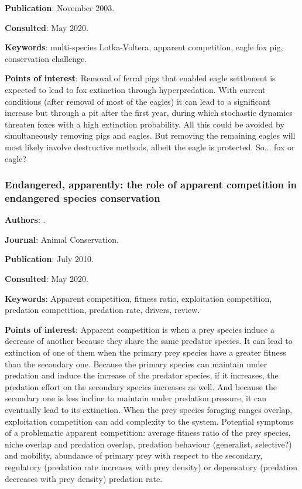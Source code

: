 \documentclass[12pt,a4paper]{article}
\begin{document}
\textbf{Publication}: November 2003.

\textbf{Consulted}: May 2020.

\textbf{Keywords}: multi-species Lotka-Voltera, apparent competition, eagle fox pig, conservation challenge.

\textbf{Points of interest}: Removal of ferral pigs that enabled eagle settlement is expected to lead to fox extinction through hyperpredation. With current conditions (after removal of most of the eagles) it can lead to a significant increase but through a pit after the first year, during which stochastic dynamics threaten foxes with a high extinction probability. All this could be avoided by simultaneously removing pigs and eagles. But removing the remaining eagles will most likely involve destructive methods, albeit the eagle is protected. So... fox or eagle?

\newpage 

\subsubsection*{Endangered, apparently: the role of apparent competition in endangered species conservation}

\textbf{Authors}: \cite{decesare2010endangered}.

\textbf{Journal}: Animal Conservation.

\textbf{Publication}: July 2010.

\textbf{Consulted}: May 2020.

\textbf{Keywords}: Apparent competition, fitness ratio, exploitation competition, predation competition, predation rate, drivers, review.

\textbf{Points of interest}: Apparent competition is when a prey species induce a decrease of another because they share the same predator species. It can lead to extinction of one of them when the primary prey species have a greater fitness than the secondary one. Because the primary species can maintain under predation and induce the increase of the predator species, if it increases, the predation effort on the secondary species increases as well. And because the secondary one is less incline to maintain under predation pressure, it can eventually lead to its extinction. When the prey species foraging ranges overlap, exploitation competition can add complexity to the system. Potential symptoms of a problematic apparent competition: average fitness ratio of the prey species, niche overlap and predation overlap, predation behaviour (generalist, selective?) and mobility, abundance of primary prey with respect to the secondary, regulatory (predation rate increases with prey density) or depensatory (predation decreases with prey density) predation rate.
\end{document}

